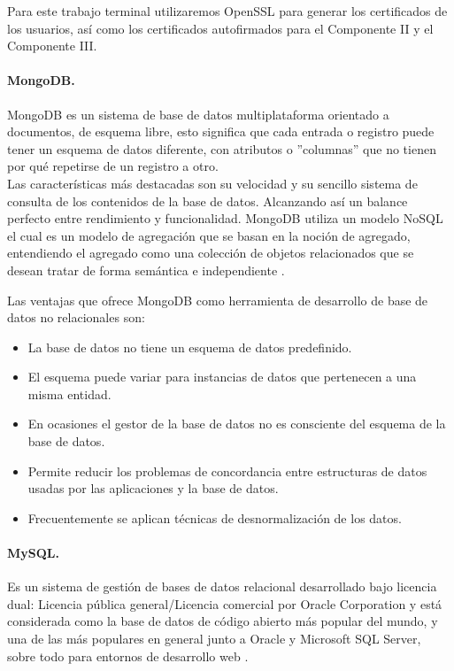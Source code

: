 \documentclass[12pt, a4paper, titlepage]{report}
\begin{document}
            Para este trabajo terminal utilizaremos OpenSSL para generar los certificados de los usuarios, así como los certificados autofirmados para el Componente II y el Componente III.
            
            \paragraph{MongoDB. \\}
            MongoDB es un sistema de base de datos multiplataforma orientado a documentos, de esquema libre, esto significa que cada entrada o registro puede tener un esquema de datos diferente, con atributos o ''columnas'' que no tienen por qué repetirse de un registro a otro. \\
            Las características más destacadas son su velocidad y su sencillo sistema de consulta de los contenidos de la base de datos. Alcanzando así un balance perfecto entre rendimiento y funcionalidad. 
            MongoDB utiliza un modelo NoSQL el cual es un modelo de agregación que se basan en la noción de agregado, entendiendo el agregado como una colección de objetos relacionados que se desean tratar de forma semántica e independiente \cite{refMongoDB}.
            
            Las ventajas que ofrece MongoDB como herramienta de desarrollo de base de datos no relacionales son:
            \begin{itemize}
                \item La base de datos no tiene un esquema de datos predefinido.
                \item El esquema puede variar para instancias de datos que pertenecen a una misma entidad.
                \item En ocasiones el gestor de la base de datos no es consciente del esquema de la base de datos.
                \item Permite reducir los problemas de concordancia entre estructuras de datos usadas por las aplicaciones y la base de datos.
                \item Frecuentemente se aplican técnicas de desnormalización de los datos.
            \end{itemize}
                    
            \paragraph{MySQL. \\}
            Es un sistema de gestión de bases de datos relacional desarrollado bajo licencia dual: Licencia pública general/Licencia comercial por Oracle Corporation y está considerada como la base de datos de código abierto más popular del mundo, y una de las más populares en general junto a Oracle y Microsoft SQL Server, sobre todo para entornos de desarrollo web \cite{refmysql}.\\
            
\end{document}
